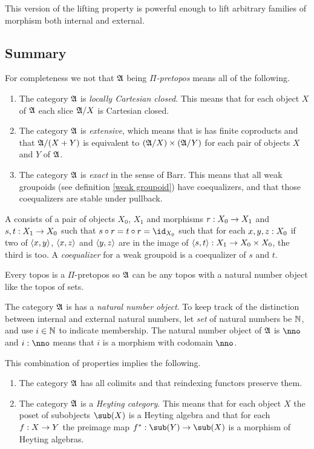 \documentclass[csh.tex]{subfiles}
\begin{document}
This version of the lifting property is powerful enough to lift arbitrary families of morphism both internal and external.

\subsection{Summary}
For completeness we not that $\mathfrak A$ being \emph{$\Pi$-pretopos} means all of the following.

\begin{enumerate}
\item The category $\mathfrak A$ is \emph{locally Cartesian closed}. This means that for each object $X$ of $\mathfrak A$ each slice $\mathfrak A/X$ is Cartesian closed.
\item The category $\mathfrak A$ is \emph{extensive}, which means that is has finite coproducts and that $\mathfrak A/(X+Y)$ is equivalent to $(\mathfrak A/X)\times(\mathfrak A/Y)$ for each pair of objects $X$ and $Y$ of $\mathfrak A$.
\item The category $\mathfrak A$ is \emph{exact} in the sense of Barr. This means that all weak groupoids (see definition \ref{weak groupoid}) have coequalizers, and that those coequalizers are stable under pullback.
\end{enumerate}

\begin{definition} A  consists of a pair of objects $X_0$, $X_1$ and morphisms $r: X_0\to X_1$ and $s,t: X_1\to X_0$ such that $s\circ r= t\circ r = \id_{X_0}$ such that for each $x,y,z: X_0$ if two of $\left\langle x,y \right\rangle$, $\left\langle x,z \right\rangle$ and $\left\langle y,z \right\rangle$ are in the image of $\left\langle s,t \right\rangle: X_1\to X_0\times X_0$, the third is too. A \emph{coequalizer} for a weak groupoid is a coequalizer of $s$ and $t$.
\end{definition}

\begin{example} Every topos is a $\Pi$-pretopos so $\mathfrak A$ can be any topos with a natural number object like the topos of sets. \end{example}

The category $\mathfrak A$ is has a \emph{natural number object}. To keep track of the distinction between internal and external natural numbers, let \emph{set} of natural numbers be $\mathbb N$, and use $i\in \mathbb N$ to indicate membership. The natural number object of $\mathfrak A$ is $\nno$ and $i\of\nno$ means that $i$ is a morphism with codomain $\nno$.

This combination of properties implies the following.
\begin{enumerate}
\item The category $\mathfrak A$ has all colimits and that reindexing functors preserve them. 
\item The category $\mathfrak A$ is a \emph{Heyting category}. This means that for each object $X$ the poset of subobjects $\sub(X)$ is a Heyting algebra and that for each $f: X\to Y$ the preimage map $f\ri\of\sub(Y)\to\sub(X)$ is a morphism of Heyting algebras.  
\end{enumerate}
\end{document}
